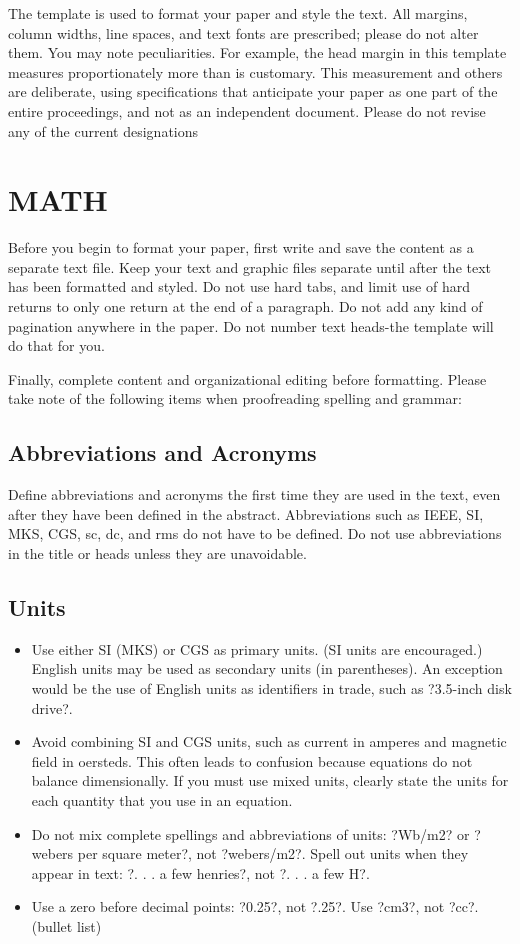 \documentclass[letterpaper, 10 pt, conference]{ieeeconf}  %
\begin{document}
The template is used to format your paper and style the text. All margins, column widths, line spaces, and text fonts are prescribed; please do not alter them. You may note peculiarities. For example, the head margin in this template measures proportionately more than is customary. This measurement and others are deliberate, using specifications that anticipate your paper as one part of the entire proceedings, and not as an independent document. Please do not revise any of the current designations

\section{MATH}

Before you begin to format your paper, first write and save the content as a separate text file. Keep your text and graphic files separate until after the text has been formatted and styled. Do not use hard tabs, and limit use of hard returns to only one return at the end of a paragraph. Do not add any kind of pagination anywhere in the paper. Do not number text heads-the template will do that for you.

Finally, complete content and organizational editing before formatting. Please take note of the following items when proofreading spelling and grammar:

\subsection{Abbreviations and Acronyms} Define abbreviations and acronyms the first time they are used in the text, even after they have been defined in the abstract. Abbreviations such as IEEE, SI, MKS, CGS, sc, dc, and rms do not have to be defined. Do not use abbreviations in the title or heads unless they are unavoidable.

\subsection{Units}

\begin{itemize}

\item Use either SI (MKS) or CGS as primary units. (SI units are encouraged.) English units may be used as secondary units (in parentheses). An exception would be the use of English units as identifiers in trade, such as ?3.5-inch disk drive?.
\item Avoid combining SI and CGS units, such as current in amperes and magnetic field in oersteds. This often leads to confusion because equations do not balance dimensionally. If you must use mixed units, clearly state the units for each quantity that you use in an equation.
\item Do not mix complete spellings and abbreviations of units: ?Wb/m2? or ?webers per square meter?, not ?webers/m2?.  Spell out units when they appear in text: ?. . . a few henries?, not ?. . . a few H?.
\item Use a zero before decimal points: ?0.25?, not ?.25?. Use ?cm3?, not ?cc?. (bullet list)

\end{itemize}
\end{document}
